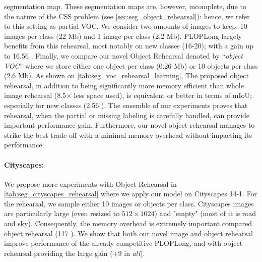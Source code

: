 segmentation map. These segmentation maps are, however, incomplete, due to the nature of the \ac{CSS}
problem (see \autoref{sec:seg_object_rehearsal}): hence, we refer to this setting as partial VOC. We
consider two amounts of images to keep: 10 images per class (22 Mb) and 1 image per class (2.2 Mb).
PLOPLong largely benefits from this rehearsal, most notably on new classes (16-20); with a gain up to
16.56 \pp. Finally, we compare our novel Object Rehearsal denoted by ``\textit{object
    VOC}'' where we store either one object per class (0.26 Mb) or 10 objects per class (2.6 Mb). As
shown on \autoref{tab:seg_voc_rehearsal_learning}, The proposed object rehearsal, in addition to
being significantly more memory efficient than whole image rehearsal (8.5$\times$ less space used),
is equivalent or better in terms of \ac{mIoU}; especially for new classes (2.56 \pp). The
ensemble of our experiments proves that rehearsal, when the partial or missing labeling is carefully
handled, can provide important performance gain. Furthermore, our novel object rehearsal manages to
strike the best trade-off with a minimal memory overhead without impacting its performance.

\paragraph{Cityscapes:} We propose more experiments with Object Rehearsal in
\autoref{tab:seg_cityscapes_rehearsal} where we apply our model on Cityscapes 14-1. For the rehearsal,
we sample either 10 images or objects per class. Cityscapes images are particularly large (even
resized to $512 \times 1024$)  and "empty" (most of it is road and sky). Consequently, the memory
overhead is extremely important compared object rehearsal (117 ). We show that both our novel
image and object rehearsal improve performance of the already competitive PLOPLong, and with object
rehearsal providing the large gain (+9 \pp in \textit{all}).

